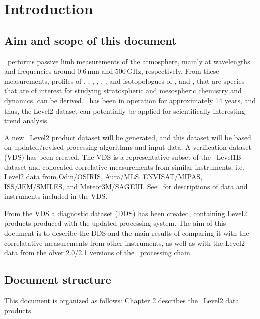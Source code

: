 \chapter{Introduction}
\label{chapter:introduction}


\setcounter{page}{1}


\section{Aim and scope of this document}
\label{sec:aim}
\smr\ performs passive limb measurements of the atmosphere, mainly at
wavelengths and frequencies around 0.6\,mm and 500\,GHz, respectively.  From
these measurements, profiles of , , ,
, , , and isotopologues of ,
and , that are species that are of interest for studying
stratospheric and mesospheric chemistry and dynamics, can be derived.  \smr\
has been in operation for approximately 14 years, and thus, the Level2 dataset
can potentially be applied for scientifically interesting trend analysis.

A new \smr\ Level2 product dataset will be generated, and this dataset will be
based on updated/revised processing algorithms and input data.  A verification
dataset (VDS) has been created. The VDS is a representative subset of the \smr\
Level1B dataset and collocated correlative measurements from similar
instruments, i.e.  Level2 data from Odin/OSIRIS, Aura/MLS, ENVISAT/MIPAS,
ISS/JEM/SMILES, and Meteor3M/SAGEIII. See~\cite{VDS:2016} for descriptions of
data and instruments included in the VDS.

From the VDS a diagnostic dataset (DDS) has been created, containing Level2
products produced with the updated processing system. The aim of this document
is to describe the DDS and the main results of comparing it with the
correlatative measurements from other instruments, as well as with the Level2
data from the olver 2.0/2.1 versions of the \smr\ processing chain.

\section{Document structure}

This document is organized as follows: Chapter 2 describes the \smr\ Level2
data products.
\TODO{add document structure as we go along}

